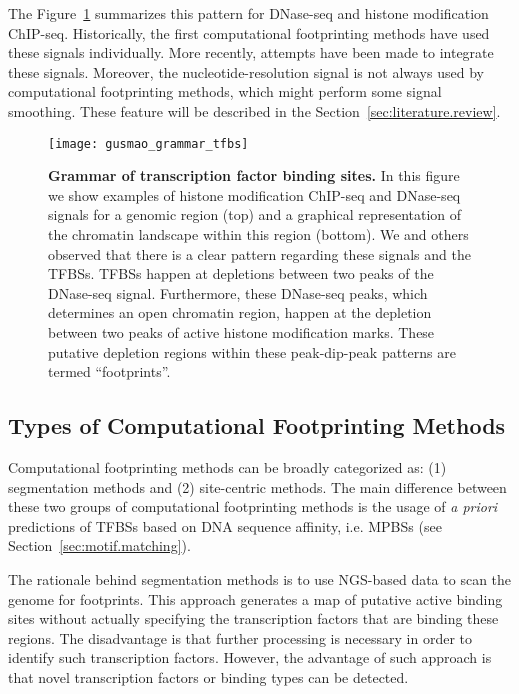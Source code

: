 The Figure~\ref{fig:gusmao_grammar_tfbs} summarizes this pattern for DNase-seq and histone modification ChIP-seq. Historically, the first computational footprinting methods have used these signals individually. More recently, attempts have been made to integrate these signals. Moreover, the nucleotide-resolution signal is not always used by computational footprinting methods, which might perform some signal smoothing. These feature will be described in the Section~\ref{sec:literature.review}.

\begin{figure}[h!]
\centering
\texttt{[image: gusmao\_grammar\_tfbs]}
\caption[Grammar of transcription factor binding sites]{\textbf{Grammar of transcription factor binding sites.} In this figure we show examples of histone modification ChIP-seq and DNase-seq signals for a genomic region (top) and a graphical representation of the chromatin landscape within this region (bottom). We and others observed that there is a clear pattern regarding these signals and the TFBSs. TFBSs happen at depletions between two peaks of the DNase-seq signal. Furthermore, these DNase-seq peaks, which determines an open chromatin region, happen at the depletion between two peaks of active histone modification marks. These putative depletion regions within these peak-dip-peak patterns are termed ``footprints''.}
\label{fig:gusmao_grammar_tfbs}
\end{figure}

\subsection{Types of Computational Footprinting Methods}
\label{sec:types.computational.footprinting.methods}

Computational footprinting methods can be broadly categorized as: (1) segmentation methods and (2) site-centric methods. The main difference between these two groups of computational footprinting methods is the usage of \emph{a priori} predictions of TFBSs based on DNA sequence affinity, i.e. MPBSs (see Section~\ref{sec:motif.matching}).

The rationale behind segmentation methods is to use NGS-based data to scan the genome for footprints. This approach generates a map of putative active binding sites without actually specifying the transcription factors that are binding these regions. The disadvantage is that further processing is necessary in order to identify such transcription factors. However, the advantage of such approach is that novel transcription factors or binding types can be detected.

